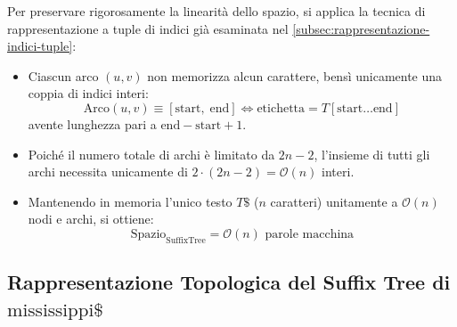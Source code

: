 Per preservare rigorosamente la linearit\`a dello spazio, si applica la tecnica di rappresentazione a tuple di indici gi\`a esaminata nel \autoref{subsec:rappresentazione-indici-tuple}:
\begin{itemize}
  \item Ciascun arco $(u, v)$ non memorizza alcun carattere, bens\`i unicamente una coppia di indici interi:
  \begin{equation}
    \text{Arco}(u, v) \equiv [\text{start}, \; \text{end}] \iff \text{etichetta} = T[\text{start} \dots \text{end}]
  \end{equation}
  avente lunghezza pari a $\text{end} - \text{start} + 1$.
  \item Poich\'e il numero totale di archi \`e limitato da $2n - 2$, l'insieme di tutti gli archi necessita unicamente di $2 \cdot (2n - 2) = \mathcal{O}(n)$ interi.
  \item Mantenendo in memoria l'unico testo $T\$$ ($n$ caratteri) unitamente a $\mathcal{O}(n)$ nodi e archi, si ottiene:
  \begin{equation}
    \text{Spazio}_{\text{SuffixTree}} = \mathcal{O}(n) \text{ parole macchina}
  \end{equation}
\end{itemize}

\FloatBarrier
\subsection{Rappresentazione Topologica del Suffix Tree di $\text{mississippi}\$$}
\label{subsec:diagramma-suffix-tree-mississippi}

